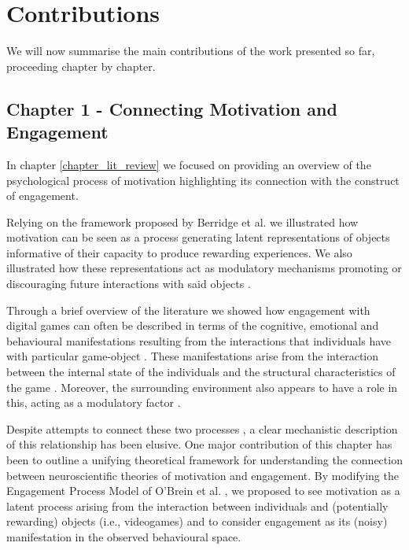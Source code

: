 \section{Contributions}

We will now summarise the main contributions of the work presented so far, proceeding chapter by chapter.

\subsection{Chapter 1 - Connecting Motivation and Engagement}
\label{discussion_chapter_one}
In chapter \ref{chapter_lit_review} we focused on providing an overview of the psychological process of motivation highlighting its connection with the construct of engagement.

Relying on the framework proposed by Berridge et al. \cite{berridge1998role} we illustrated how motivation can be seen as a process generating latent representations of objects informative of their capacity to produce rewarding experiences. We also illustrated how these representations act as modulatory mechanisms promoting or discouraging future interactions with said objects \cite{berridge2004motivation}.

Through a brief overview of the literature we showed how engagement with digital games can often be described in terms of the cognitive, emotional and behavioural manifestations resulting from the interactions that individuals have with particular game-object \cite{boyle2012engagement, jennett2008measuring, przybylski2010motivational}. These manifestations arise from the interaction between the internal state of the individuals and the structural characteristics of the game \cite{lucas2004sex,o2008user,jennett2008measuring,boyle2012engagement,connolly2012systematic,csikszentmihalyi2014toward}. Moreover, the surrounding environment also appears to have a role in this, acting as a modulatory factor \cite{o2008user, bialas2014cultural, vihanga2019weekly, zendle2022transnational}.

Despite attempts to connect these two processes \cite{przybylski2010motivational, nacke2011brainhex, deterding2022mastering}, a clear mechanistic description of this relationship has been elusive. One major contribution of this chapter has been to outline a unifying theoretical framework for understanding the connection between neuroscientific theories of motivation and engagement. By modifying the Engagement Process Model of O'Brein et al. \cite{o2008usero}, we proposed to see motivation as a latent process arising from the interaction between individuals and (potentially rewarding) objects (i.e., videogames) and to consider engagement as its (noisy) manifestation in the observed behavioural space. 

